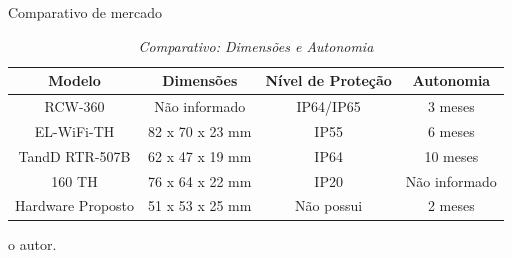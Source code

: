 \begin{frame}{Comparativo de mercado}
    
    \begin{table}[!h]
    	
    	\captionsetup{width=9cm}%
    	\caption{\label{tab:compara_dimensoes} \textit{Comparativo: Dimensões e Autonomia}}%
    	
    		\begin{tabular}{cccc}
    			\toprule
    			Modelo & Dimensões & Nível de Proteção  & Autonomia \\
    			\midrule \midrule
               RCW-360           & Não informado   & IP64/IP65 & 3 meses       \\
               EL-WiFi-TH        & 82 x 70 x 23 mm & IP55  &6 meses       \\
               TandD RTR-507B    & 62 x 47 x 19 mm & IP64  &10 meses      \\
               160 TH            & 76 x 64 x 22 mm & IP20  & Não informado \\
               Hardware Proposto & 51 x 53 x 25 mm & Não possui & 2 meses  \\
    	    \bottomrule
    		\end{tabular}%
    	\tiny{o autor.}%

    \end{table}

    



    
\end{frame}





